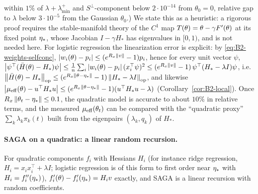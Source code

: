 \begin{remark}
within $1\%$ of $\lambda+\lambda^+_{\min}$ and $S^\perp$-component below $2\cdot10^{-14}$ from $\theta_0=0$, relative gap
to $\lambda$ below $3\cdot10^{-5}$ from the Gaussian $\theta_0$.) We state this as
a heuristic: a rigorous proof requires the stable-manifold theory of the $C^1$ map $T(\theta)=\theta-\gamma F'(\theta)$
at its fixed point $\eta_\ast$, whose Jacobian $I-\gamma H_\ast$ has eigenvalues in $[0,1)$, and is not needed
here. For logistic regression the linearization error is explicit: by \eqref{eq:B2-weights-selfconc},
$\left|w_i(\theta)-p_i\right|\le(e^{R_x\left\|v\right\|}-1)p_i$, hence for every unit vector $\psi$,
$\left|\psi^\top(\bar H(\theta)-H_\ast)\psi\right|\le\frac1n\sum_i\left|w_i(\theta)-p_i\right|(x_i^\top\psi)^2\le(e^{R_x\left\|v\right\|}-1)\,\psi^\top(H_\ast-\lambda I)\psi$,
i.e.\ $\left\|\bar H(\theta)-H_\ast\right\|_{\mathrm{op}}\le(e^{R_x\left\|\theta-\eta_\ast\right\|}-1)\left\|H_\ast-\lambda I\right\|_{\mathrm{op}}$,
and likewise $\left|\mu_{\mathrm{eff}}(\theta)-u^\top H_\ast u\right|\le(e^{R_x\left\|\theta-\eta_\ast\right\|}-1)(u^\top H_\ast u-\lambda)$
(Corollary~\ref{cor:B2-local}). Once $R_x\left\|\theta_t-\eta_\ast\right\|\le0.1$, the quadratic model is accurate to
about $10\%$ in relative terms, and the measured $\mu_{\mathrm{eff}}(\theta_t)$ can be compared with the ``quadratic proxy''
$\sum_k\lambda_k\pi_k(t)$ built from the eigenpairs $(\lambda_k,q_k)$ of $H_\ast$.
\end{remark}

\paragraph{SAGA on a quadratic: a linear random recursion.}
For quadratic components $f_i$ with Hessians $H_i$ (for instance ridge regression, $H_i=x_ix_i^\top+\lambda I$; logistic
regression is of this form to first order near $\eta_\ast$ with $H_i=f_i''(\eta_\ast)$),
$f'_i(\theta)-f'_i(\eta_\ast)=H_iv$ exactly, and SAGA is a linear recursion with random coefficients.

